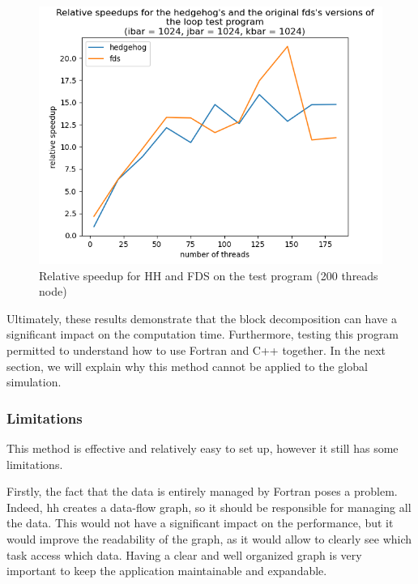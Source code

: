\begin{figure}[ht!]
  \begin{center}
    \includegraphics[scale=0.6]{img/fds-loops/relative_speedup.png}
    \caption{Relative speedup for HH and FDS on the test program (200 threads node)}
    \label{fig:loopsrelativespeedup}
  \end{center}
\end{figure}

Ultimately, these results demonstrate that the block decomposition can have a
significant impact on the computation time. Furthermore, testing this program
permitted to understand how to use Fortran and C++ together. In the next
section, we will explain why this method cannot be applied to the global
simulation.

\subsubsection{Limitations}

This method is effective and relatively easy to set up, however it still has
some limitations.

Firstly, the fact that the data is entirely managed by Fortran poses a problem.
Indeed, \gls{hh} creates a data-flow graph, so it should be responsible for
managing all the data. This would not have a significant impact on the
performance, but it would improve the readability of the graph, as it would
allow to clearly see which task access which data. Having a clear and well
organized graph is very important to keep the application maintainable and
expandable.

